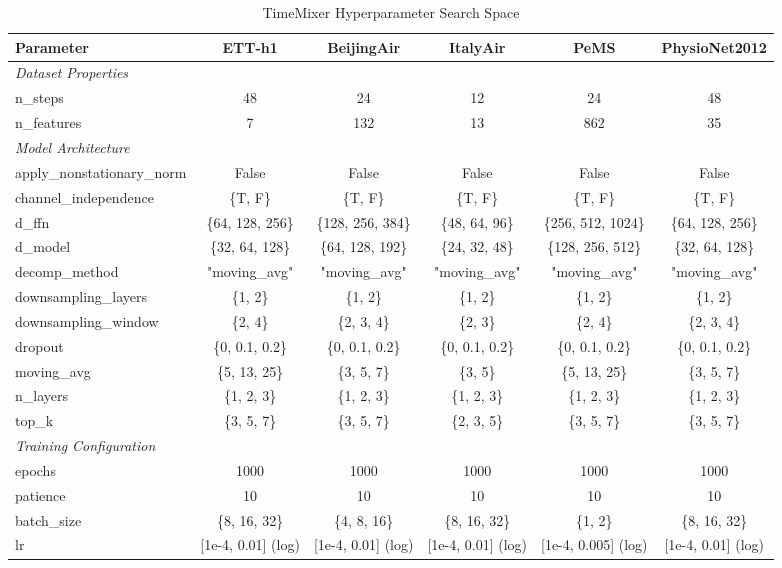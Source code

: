\begin{table}[H]
\centering
\caption{TimeMixer Hyperparameter Search Space}
\label{tab:hyperparam_timemixer}
\begin{adjustbox}{max width=\textwidth}
\begin{small}
\begin{tabular}{l|ccccc}
\toprule
\textbf{Parameter} & \textbf{ETT-h1} & \textbf{BeijingAir} & \textbf{ItalyAir} & \textbf{PeMS} & \textbf{PhysioNet2012} \\
\midrule
\multicolumn{6}{l}{\textit{Dataset Properties}} \\
n\_steps & 48 & 24 & 12 & 24 & 48 \\
n\_features & 7 & 132 & 13 & 862 & 35 \\
\midrule
\multicolumn{6}{l}{\textit{Model Architecture}} \\
apply\_nonstationary\_norm & False & False & False & False & False \\
channel\_independence & \{T, F\} & \{T, F\} & \{T, F\} & \{T, F\} & \{T, F\} \\
d\_ffn & \{64, 128, 256\} & \{128, 256, 384\} & \{48, 64, 96\} & \{256, 512, 1024\} & \{64, 128, 256\} \\
d\_model & \{32, 64, 128\} & \{64, 128, 192\} & \{24, 32, 48\} & \{128, 256, 512\} & \{32, 64, 128\} \\
decomp\_method & "moving\_avg" & "moving\_avg" & "moving\_avg" & "moving\_avg" & "moving\_avg" \\
downsampling\_layers & \{1, 2\} & \{1, 2\} & \{1, 2\} & \{1, 2\} & \{1, 2\} \\
downsampling\_window & \{2, 4\} & \{2, 3, 4\} & \{2, 3\} & \{2, 4\} & \{2, 3, 4\} \\
dropout & \{0, 0.1, 0.2\} & \{0, 0.1, 0.2\} & \{0, 0.1, 0.2\} & \{0, 0.1, 0.2\} & \{0, 0.1, 0.2\} \\
moving\_avg & \{5, 13, 25\} & \{3, 5, 7\} & \{3, 5\} & \{5, 13, 25\} & \{3, 5, 7\} \\
n\_layers & \{1, 2, 3\} & \{1, 2, 3\} & \{1, 2, 3\} & \{1, 2, 3\} & \{1, 2, 3\} \\
top\_k & \{3, 5, 7\} & \{3, 5, 7\} & \{2, 3, 5\} & \{3, 5, 7\} & \{3, 5, 7\} \\
\midrule
\multicolumn{6}{l}{\textit{Training Configuration}} \\
epochs & 1000 & 1000 & 1000 & 1000 & 1000 \\
patience & 10 & 10 & 10 & 10 & 10 \\
batch\_size & \{8, 16, 32\} & \{4, 8, 16\} & \{8, 16, 32\} & \{1, 2\} & \{8, 16, 32\} \\
lr & [1e-4, 0.01] (log) & [1e-4, 0.01] (log) & [1e-4, 0.01] (log) & [1e-4, 0.005] (log) & [1e-4, 0.01] (log) \\
\bottomrule
\end{tabular}
\end{small}
\end{adjustbox}
\end{table}